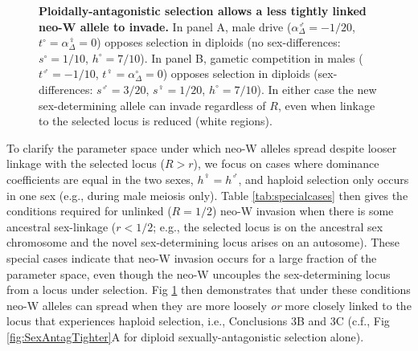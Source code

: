\documentclass[10pt,letterpaper]{article}
\providecommand{\DIFdelbeginFL}{} %
\providecommand{\DIFdelendFL}{} %
\begin{document}
\begin{figure}[!h]
\centering
\DIFdelbeginFL %
\DIFdelendFL %
\caption{
{\bf Ploidally-antagonistic selection allows a less tightly linked neo-W allele to invade.}
In panel A, male drive ($\alpha^\male_{\Delta} = -1/20$, $t^\circ = \alpha^\female_{\Delta} = 0$) opposes selection in diploids (no sex-differences: $s^\circ = 1/10$, $h^\circ = 7/10$).   
In panel B, gametic competition in males ($t^\male = -1/10$, $t^\female = \alpha^\circ_{\Delta} = 0$) opposes selection in diploids (sex-differences: $s^\male = 3/20$, $s^\female = 1/20$, $h^\circ = 7/10$).
In either case the new sex-determining allele can invade regardless of $R$, even when linkage to the selected locus is reduced (white regions).
}
\label{fig:Combination_Centimorgans}
\end{figure}

To clarify the parameter space under which neo-W alleles spread despite looser linkage with the selected locus ($R>r$), we focus on cases where dominance coefficients are equal in the two sexes, $h^\female=h^\male$, and haploid selection only occurs in one sex (e.g., during male meiosis only).
Table \ref{tab:specialcases} then gives the conditions required for unlinked ($R=1/2$) neo-W invasion when there is some ancestral sex-linkage ($r<1/2$; e.g., the selected locus is on the ancestral sex chromosome and the novel sex-determining locus arises on an autosome). 
These special cases indicate that neo-W invasion occurs for a large fraction of the parameter space, even though the neo-W uncouples the sex-determining locus from a locus under selection. 
Fig \ref{fig:Combination_Centimorgans} then demonstrates that under these conditions neo-W alleles can spread when they are more loosely \textit{or} more closely linked to the locus that experiences haploid selection, i.e., Conclusions 3B and 3C (c.f., Fig \ref{fig:SexAntagTighter}A for diploid sexually-antagonistic selection alone). 
\end{document}
